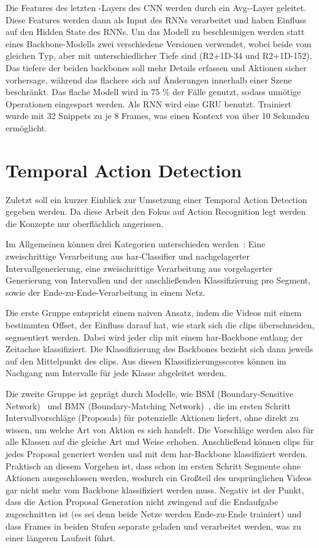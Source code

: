 Die Features des letzten \conv-Layers des CNN werden durch ein Avg-\pool-Layer geleitet.
Diese Features werden dann als Input des RNNs verarbeitet und haben Einfluss auf den Hidden State des RNNs.
Um das Modell zu beschleunigen werden statt eines Backbone-Modells zwei verschiedene Versionen verwendet, wobei beide vom gleichen Typ, aber mit unterschiedlicher Tiefe sind (\zB R2+1D-34 und R2+1D-152).
Das tiefere der beiden backbones soll mehr Details erfassen und Aktionen sicher vorhersage, während das flachere sich auf Änderungen innerhalb einer Szene beschränkt.
Das flache Modell wird in 75 \% der Fälle genutzt, sodass unnötige Operationen eingespart werden.
Als RNN wird eine GRU benutzt.
Trainiert wurde mit 32 Snippets zu je 8 Frames, was einen Kontext von über 10 Sekunden ermöglicht.

\section{Temporal Action Detection}
\label{sec:temporal-action-detection}

Zuletzt soll ein kurzer Einblick zur Umsetzung einer Temporal Action Detection gegeben werden.
Da diese Arbeit den Fokus auf Action Recognition legt werden die Konzepte nur oberflächlich angerissen.

Im Allgemeinen können drei Kategorien unterschieden werden~\cite{Buch17}:
Eine zweischrittige Verarbeitung aus \gls{har}-Classifier und nachgelagerter Intervallgenerierung, eine zweischrittige Verarbeitung aus vorgelagerter Generierung von Intervallen und der anschließenden Klassifizierung pro Segment, sowie der Ende-zu-Ende-Verarbeitung in einem Netz.

Die erste Gruppe entspricht einem naiven Ansatz, indem die Videos mit einem bestimmten Offset, der Einfluss darauf hat, wie stark sich die \glspl{clip} überschneiden, segmentiert werden.
Dabei wird jeder \gls{clip} mit einem \gls{har}-Backbone entlang der Zeitachse klassifiziert.
Die Klassifizierung des Backbones bezieht sich dann jeweils auf den Mittelpunkt des \glspl{clip}.
Aus diesen Klassifizierungsscores können im Nachgang nun Intervalle für jede Klasse abgeleitet werden.

Die zweite Gruppe ist geprägt durch Modelle, wie BSM (Boundary-Sensitive Network)~\cite{Lin18} und BMN (Boundary-Matching Network)~\cite{Lin19}, die im ersten Schritt Intervallvorschläge (Proposals) für potenzielle Aktionen liefert, ohne direkt zu wissen, um welche Art von Aktion es sich handelt.
Die Vorschläge werden also für alle Klassen auf die gleiche Art und Weise erhoben.
Anschließend können \glspl{clip} für jedes Proposal generiert werden und mit dem \gls{har}-Backbone klassifiziert werden.
Praktisch an diesem Vorgehen ist, dass schon im ersten Schritt Segmente ohne Aktionen ausgeschlossen werden, wodurch ein Großteil des ursprünglichen Videos gar nicht mehr vom Backbone klassifiziert werden muss.
Negativ ist der Punkt, dass die Action Proposal Generation nicht zwingend auf die Endaufgabe zugeschnitten ist (es sei denn beide Netze werden Ende-zu-Ende trainiert) und dass Frames in beiden Stufen separate geladen und verarbeitet werden, was zu einer längeren Laufzeit führt.

